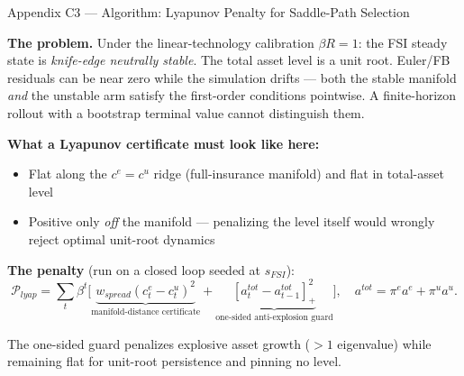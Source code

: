 \documentclass[10pt,aspectratio=169]{beamer}
\begin{document}
\begin{frame}[label=appLyap]{Appendix C3 --- Algorithm: Lyapunov Penalty for Saddle-Path Selection}
\hfill\hyperlink{mainFinalAlgo}{}
\vspace{0.2em}

\textbf{The problem.} Under the linear-technology calibration $\beta R=1$: the FSI steady state
is \emph{knife-edge neutrally stable}. The total asset level is a unit root.
Euler/FB residuals can be near zero while the simulation drifts --- both the stable manifold
\emph{and} the unstable arm satisfy the first-order conditions pointwise.
A finite-horizon rollout with a bootstrap terminal value cannot distinguish them.

\smallskip
\textbf{What a Lyapunov certificate must look like here:}
\begin{itemize}
  \item Flat along the $c^e=c^u$ ridge (full-insurance manifold) and flat in total-asset level
  \item Positive only \emph{off} the manifold --- penalizing the level itself would wrongly reject
        optimal unit-root dynamics
\end{itemize}

\textbf{The penalty} (run on a closed loop seeded at $s_{FSI}$):
\[
\mathcal{P}_{lyap}=\sum_t\beta^t\Big[\underbrace{w_{spread}(c^e_t-c^u_t)^2}_{\text{manifold-distance certificate}}
+\underbrace{[a^{tot}_t-a^{tot}_{t-1}]_+^2}_{\text{one-sided anti-explosion guard}}\Big],
\quad a^{tot}=\pi^e a^e+\pi^u a^u.
\]

The one-sided guard penalizes explosive asset growth ($>1$ eigenvalue) while remaining
flat for unit-root persistence and pinning no level.
\end{frame}
\end{document}
